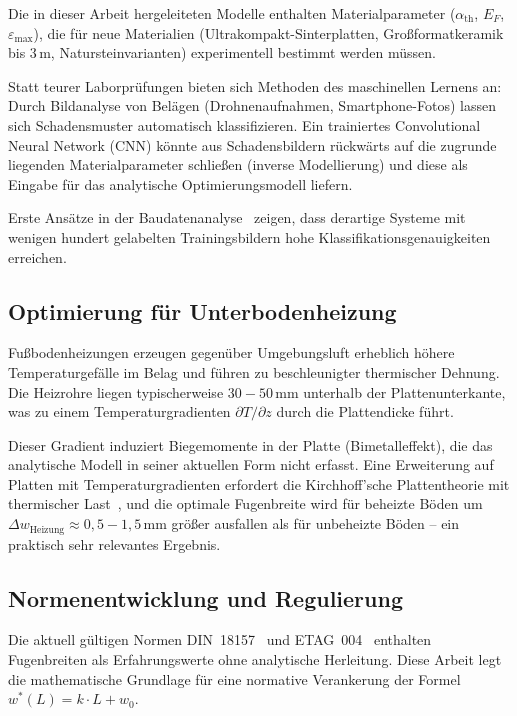 ﻿\documentclass[a4paper,12pt]{article}
\theoremstyle{definition}
\begin{document}
Die in dieser Arbeit hergeleiteten Modelle enthalten Materialparameter
($\alpha_{\text{th}}$, $E_F$, $\varepsilon_{\max}$), die für neue
Materialien (Ultrakompakt-Sinterplatten, Großformatkeramik bis $3\,\text{m}$,
Natursteinvarianten) experimentell bestimmt werden müssen.

Statt teurer Laborprüfungen bieten sich Methoden des maschinellen Lernens
an: Durch Bildanalyse von Belägen (Drohnenaufnahmen, Smartphone-Fotos)
lassen sich Schadensmuster automatisch klassifizieren. Ein trainiertes
Convolutional Neural Network (CNN) könnte aus Schadensbildern rückwärts
auf die zugrunde liegenden Materialparameter schließen (inverse Modellierung)
und diese als Eingabe für das analytische Optimierungsmodell liefern.

Erste Ansätze in der Baudatenanalyse~\cite{lecun2015} zeigen, dass
derartige Systeme mit wenigen hundert gelabelten Trainingsbildern
hohe Klassifikationsgenauigkeiten erreichen.

\subsection{Optimierung für Unterbodenheizung}

Fußbodenheizungen erzeugen gegenüber Umgebungsluft erheblich höhere
Temperaturgefälle im Belag und führen zu beschleunigter thermischer
Dehnung. Die Heizrohre liegen typischerweise $30{-}50\,\text{mm}$
unterhalb der Plattenunterkante, was zu einem Temperaturgradienten
$\partial T/\partial z$ durch die Plattendicke führt.

Dieser Gradient induziert Biegemomente in der Platte (Bimetalleffekt),
die das analytische Modell in seiner aktuellen Form nicht erfasst.
Eine Erweiterung auf Platten mit Temperaturgradienten erfordert die
Kirchhoff'sche Plattentheorie mit thermischer Last~\cite{timoshenko1959},
und die optimale Fugenbreite wird für beheizte Böden um
$\Delta w_{\text{Heizung}} \approx 0{,}5{-}1{,}5\,\text{mm}$ größer
ausfallen als für unbeheizte Böden -- ein praktisch sehr relevantes Ergebnis.

\subsection{Normenentwicklung und Regulierung}

Die aktuell gültigen Normen DIN~18157~\cite{din18157} und ETAG~004~\cite{etag004}
enthalten Fugenbreiten als Erfahrungswerte ohne analytische Herleitung.
Diese Arbeit legt die mathematische Grundlage für eine normative
Verankerung der Formel $w^*(L) = k \cdot L + w_0$.
\end{document}

